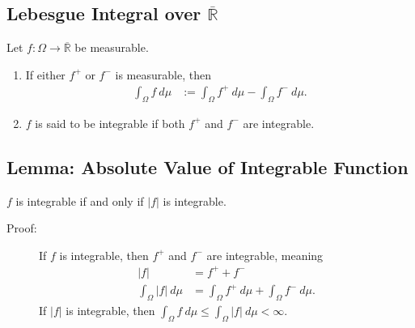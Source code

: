 \documentclass[9pt]{extarticle}
\newcommand{\R}{\mathbb{R}}
\begin{document}
  \subsection{Lebesgue Integral over $\overline{\R}$}%
  Let $f: \Omega \rightarrow \overline{\R}$ be measurable.
  \begin{enumerate}[(1)]
    \item If either $f^{+}$ or $f^{-}$ is measurable, then
      \begin{align*}
        \int_{\Omega}f~d\mu &:= \int_{\Omega}f^{+}~d\mu - \int_{\Omega}f^{-}~d\mu.
      \end{align*}
    \item $f$ is said to be integrable if both $f^{+}$ and $f^{-}$ are integrable.
  \end{enumerate}
  \subsection{Lemma: Absolute Value of Integrable Function}%
  $f$ is integrable if and only if $|f|$ is integrable.
  \begin{description}
    \item[Proof:] If $f$ is integrable, then $f^{+}$ and $f^{-}$ are integrable, meaning
      \begin{align*}
        |f| &= f^{+}+f^{-}\\
        \int_{\Omega}|f|~d\mu &= \int_{\Omega}f^{+}~d\mu + \int_{\Omega}f^{-}~d\mu.
      \end{align*}
      If $|f|$ is integrable, then $\int_{\Omega}f~d\mu \leq \int_{\Omega}|f|~d\mu < \infty$.
  \end{description}
\end{document}
